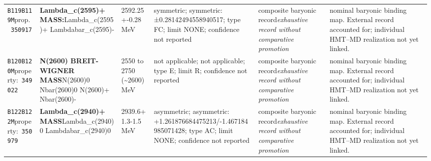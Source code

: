\begin{landscape}
\begin{longtable}{L{1.85cm}L{4.45cm}L{2.35cm}L{4.05cm}L{3.35cm}L{7.15cm}}
\texttt{B119}\newline \texttt{B119M}\newline prop.\ \texttt{350917} & \textbf{Lambda\_\allowbreak{}c(2595)+ MASS:}\newline Lambda\_\allowbreak{}c(2595)+ \textbar{}\allowbreak{} Lambdabar\_\allowbreak{}c(2595)- & 2592.25+-0.28\,MeV & symmetric; symmetric: ±0.28142494558940517; type FC; limit NONE; confidence not reported & composite baryonic record\newline \emph{exhaustive record without comparative promotion} & nominal baryonic binding map. External record accounted for; individual HMT--MD realization not yet linked. \\
\texttt{B120}\newline \texttt{B120M}\newline property:\ \texttt{349022} & \textbf{N(2600) BREIT-WIGNER MASS}\newline N(2600)0 \textbar{}\allowbreak{} Nbar(2600)0 \textbar{}\allowbreak{} N(2600)+ \textbar{}\allowbreak{} Nbar(2600)- & 2550 to 2750 (\textasciitilde{}2600)\,MeV & not applicable; not applicable; type E; limit R; confidence not reported & composite baryonic record\newline \emph{exhaustive record without comparative promotion} & nominal baryonic binding map. External record accounted for; individual HMT--MD realization not yet linked. \\
\texttt{B122}\newline \texttt{B122M}\newline property:\ \texttt{350979} & \textbf{Lambda\_\allowbreak{}c(2940)+ MASS}\newline Lambda\_\allowbreak{}c(2940)0 \textbar{}\allowbreak{} Lambdabar\_\allowbreak{}c(2940)0 & 2939.6+1.3-1.5\,MeV & asymmetric; asymmetric: +1.261876684475213/-1.467184985071428; type AC; limit NONE; confidence not reported & composite baryonic record\newline \emph{exhaustive record without comparative promotion} & nominal baryonic binding map. External record accounted for; individual HMT--MD realization not yet linked. \\

\end{longtable}
\end{landscape}
